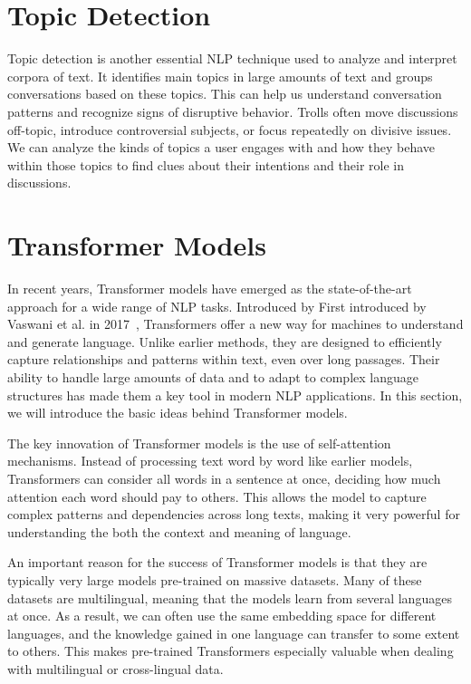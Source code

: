\documentclass[twoside]{ctuthesis}
\theoremstyle{plain}
\theoremstyle{definition}
\theoremstyle{note}
\begin{document}
\section{Topic Detection}
Topic detection is another essential NLP technique used to analyze and interpret corpora of text. It identifies main topics in large amounts of text and groups conversations based on these topics. This can help us understand conversation patterns and recognize signs of disruptive behavior. Trolls often move discussions off-topic, introduce controversial subjects, or focus repeatedly on divisive issues. We can analyze the kinds of topics a user engages with and how they behave within those topics to find clues about their intentions and their role in discussions.\par

\section{Transformer Models}
In recent years, Transformer models have emerged as the state-of-the-art approach for a wide range of NLP tasks. Introduced by First introduced by Vaswani et al. in 2017~\cite{Vaswani2017}, Transformers offer a new way for machines to understand and generate language. Unlike earlier methods, they are designed to efficiently capture relationships and patterns within text, even over long passages. Their ability to handle large amounts of data and to adapt to complex language structures has made them a key tool in modern NLP applications. In this section, we will introduce the basic ideas behind Transformer models.\par

The key innovation of Transformer models is the use of self-attention mechanisms. Instead of processing text word by word like earlier models, Transformers can consider all words in a sentence at once, deciding how much attention each word should pay to others. This allows the model to capture complex patterns and dependencies across long texts, making it very powerful for understanding the both the context and meaning of language.\par

An important reason for the success of Transformer models is that they are typically very large models pre-trained on massive datasets. Many of these datasets are multilingual, meaning that the models learn from several languages at once. As a result, we can often use the same embedding space for different languages, and the knowledge gained in one language can transfer to some extent to others. This makes pre-trained Transformers especially valuable when dealing with multilingual or cross-lingual data.\par
\end{document}
